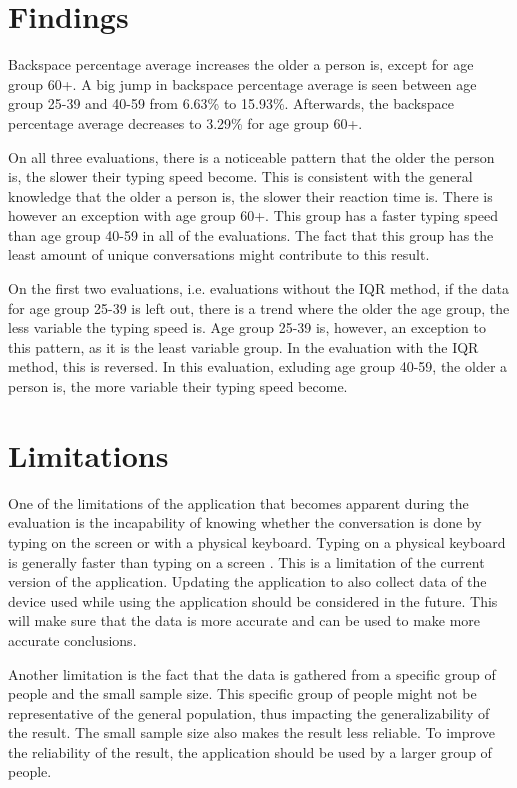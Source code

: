 \section{Findings}

Backspace percentage average increases the older a person is, except for age group 60+.
A big jump in backspace percentage average is seen between age group 25-39 and 40-59 from 6.63\% to 15.93\%.
Afterwards, the backspace percentage average decreases to 3.29\% for age group 60+.

On all three evaluations, there is a noticeable pattern that the older the person is, the slower their typing speed become.
This is consistent with the general knowledge that the older a person is, the slower their reaction time is.
There is however an exception with age group 60+.
This group has a faster typing speed than age group 40-59 in all of the evaluations.
The fact that this group has the least amount of unique conversations might contribute to this result.

On the first two evaluations, i.e. evaluations without the \ac{IQR} method, if the data for age group 25-39 is left out, there is a trend where the older the age group, the less variable the typing speed is.
Age group 25-39 is, however, an exception to this pattern, as it is the least variable group.
In the evaluation with the \ac{IQR} method, this is reversed.
In this evaluation, exluding age group 40-59, the older a person is, the more variable their typing speed become.

\section{Limitations}

One of the limitations of the application that becomes apparent during the evaluation is the incapability of knowing whether the conversation is done by typing on the screen or with a physical keyboard.
Typing on a physical keyboard is generally faster than typing on a screen \cite{Varcholik2012}.
This is a limitation of the current version of the application.
Updating the application to also collect data of the device used while using the application should be considered in the future.
This will make sure that the data is more accurate and can be used to make more accurate conclusions.

Another limitation is the fact that the data is gathered from a specific group of people and the small sample size.
This specific group of people might not be representative of the general population, thus impacting the generalizability of the result.
The small sample size also makes the result less reliable.
To improve the reliability of the result, the application should be used by a larger group of people.